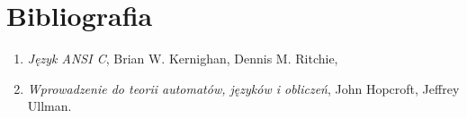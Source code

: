 \documentclass[10pt, a4paper]{report}
\begin{document}
    \section{Bibliografia}
    \begin{enumerate}
        \item \textit{Język ANSI C}, Brian W. Kernighan, Dennis M. Ritchie,
        \item \textit{Wprowadzenie do teorii automatów, języków i obliczeń}, John Hopcroft, Jeffrey Ullman.
    \end{enumerate}
\end{document}
